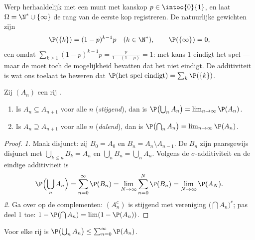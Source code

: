 \begin{example}\label{ex:b2:proba:geometric}
Werp herhaaldelijk met een munt met kanskop $p \in \intoo{0}{1}$,
en laat $\Omega = \N^* \cup \{\infty\}$ de rang van de eerste kop
registreren. De natuurlijke gewichten zijn
\[
\P(\{k\}) = (1 - p)^{k-1}p
\quad (k \in \N^*),
\qquad
\P(\{\infty\}) = 0 ,
\]
een  omdat $\sum_{k\geq1}(1-p)^{k-1}p = \frac{p}{1 -
(1-p)} = 1$: met kans $1$ eindigt het spel --- maar de
 moet toch de mogelijkheid bevatten dat het niet
eindigt. De  additiviteit is wat ons toelaat te beweren
dat $\P(\text{het spel eindigt}) = \sum_k \P(\{k\})$.
\end{example}

\begin{theorem}\label{thm:b2:proba:continuity}
Zij $(A_n)$ een rij .
\begin{enumerate}
\item Is $A_n \subseteq A_{n+1}$ voor alle $n$
(\emph{stijgend}), dan is $\P\bigl(\bigcup_n A_n\bigr) =
\lim_{n\to\infty} \P(A_n)$.
\item Is $A_n \supseteq A_{n+1}$ voor alle $n$
(\emph{dalend}), dan is $\P\bigl(\bigcap_n A_n\bigr) =
\lim_{n\to\infty} \P(A_n)$.
\end{enumerate}
\end{theorem}

\begin{proof}
\emph{1.} Maak disjunct: zij $B_0 = A_0$ en $B_n = A_n \setminus
A_{n-1}$. De $B_n$ zijn paarsgewijs disjunct met $\bigcup_{k \leq
n} B_k = A_n$ en $\bigcup_n B_n = \bigcup_n A_n$. Volgens de
$\sigma$-additiviteit en de eindige additiviteit is
\[
\P\Bigl(\bigcup_n A_n\Bigr)
= \sum_{n=0}^\infty \P(B_n)
= \lim_{N\to\infty}\sum_{n=0}^N \P(B_n)
= \lim_{N\to\infty}\P(A_N) .
\]
\emph{2.} Ga over op de complementen: $(A_n^c)$ is stijgend met
vereniging $\bigl(\bigcap A_n\bigr)^c$; pas deel 1 toe: $1 -
\P(\bigcap A_n) = \lim (1 - \P(A_n))$.
\end{proof}

\begin{corollary}\label{cor:b2:proba:subadd}
Voor elke rij  is $\P\bigl(\bigcup_n A_n\bigr) \leq
\sum_{n=0}^\infty \P(A_n)$.
\end{corollary}

